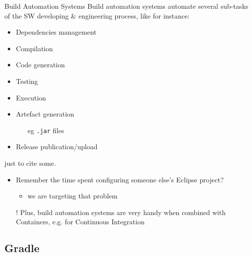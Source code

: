 \documentclass[presentation]{beamer}\mode<presentation>{\usetheme{AMSBolognaFC}}
\begin{document}
\begin{frame}{Build Automation Systems}
    Build automation systems \alert{automate} several sub-tasks of the SW developing \& engineering process, like for instance:
    \begin{multicols}{2}
        \begin{itemize}
            \item Dependencies management

            \item \alert{Compilation}

            \item Code generation

            \item Testing

            \item Execution

            \item Artefact generation
            \begin{itemize}
                \item[eg] \texttt{.jar} files
            \end{itemize}

            \item Release publication/upload
        \end{itemize}
    \end{multicols}
    just to cite some.

    \vfill

    \begin{itemize}

        \item Remember the time spent configuring someone else's Eclipse project?
        \begin{itemize}
            \item we are targeting that problem
        \end{itemize}

        \item[!] Plus, build automation systems are very handy when combined with Containers, e.g. for Continuous Integration

    \end{itemize}


\end{frame}

\subsection{Gradle}
\end{document}
